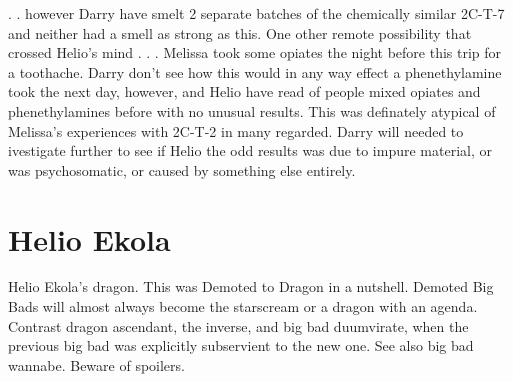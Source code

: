 \documentclass[12pt]{book}
\begin{document}
. .  however Darry have smelt 2 separate batches of the chemically similar 2C-T-7 and neither had a smell as strong as this. One other remote possibility that crossed Helio's mind . . .  Melissa took some opiates the night before this trip for a toothache. Darry don't see how this would in any way effect a phenethylamine took the next day, however, and Helio have read of people mixed opiates and phenethylamines before with no unusual results. This was definately atypical of Melissa's experiences with 2C-T-2 in many regarded. Darry will needed to ivestigate further to see if Helio the odd results was due to impure material, or was psychosomatic, or caused by something else entirely.






\chapter{Helio Ekola}

Helio Ekola's dragon. This was Demoted to Dragon in a nutshell. Demoted Big Bads will almost always become the starscream or a dragon with an agenda. Contrast dragon ascendant, the inverse, and big bad duumvirate, when the previous big bad was explicitly subservient to the new one. See also big bad wannabe. Beware of spoilers.
\end{document}
